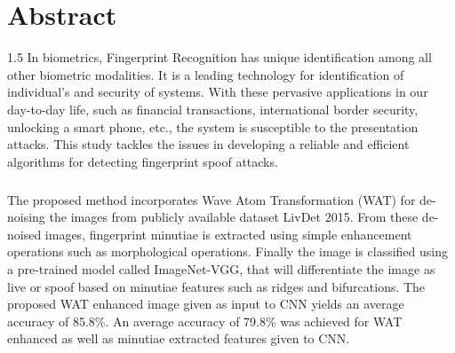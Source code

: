 \chapter*{Abstract}
\begin{spacing}{1.5}
In biometrics, Fingerprint Recognition has unique identification among all other biometric modalities. It is a leading technology for identification of individual's and security of systems. With these pervasive applications in our day-to-day life, such as financial transactions, international border security, unlocking a smart phone, etc., the system is susceptible to the presentation attacks. This study tackles the issues in developing a reliable and efficient algorithms for detecting fingerprint spoof attacks.
\paragraph{}
The proposed method incorporates Wave Atom Transformation (WAT) for de-noising the images from publicly available dataset LivDet 2015. From these de-noised images, fingerprint minutiae is extracted using simple enhancement operations such as morphological operations. Finally the image is classified using a pre-trained model called ImageNet-VGG, that will differentiate the image as live or spoof based on minutiae features such as ridges and bifurcations. The proposed WAT enhanced image given as input to CNN yields an average accuracy of 85.8\%. An average accuracy of 79.8\% was achieved for WAT enhanced as well as minutiae extracted features given to CNN. 
\end{spacing}

